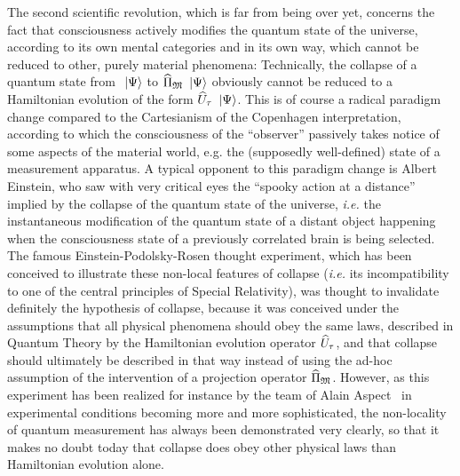 The second scientific revolution, which is far from being over yet, concerns the fact that consciousness actively modifies the quantum state of the universe, according to its own mental categories and in its own way, which cannot be reduced to other, purely material phenomena: Technically, the collapse of a quantum state from $\ \left|{\Psi}\right\rangle$ to $\widehat{\Pi}_{\mathfrak{M}} \ \left|{\Psi}\right\rangle$ obviously cannot be reduced to a Hamiltonian evolution of the form $\widehat{U}_\tau \ \left|{\Psi}\right\rangle$.
This is of course a radical paradigm change compared to the Cartesianism of the Copenhagen interpretation, according to which the consciousness of the ``observer'' passively takes notice of some aspects of the material world, e.g. the (supposedly well-defined) state of a measurement apparatus.
A typical opponent to this paradigm change is Albert Einstein, who saw with very critical eyes the ``spooky action at a distance'' implied by the collapse of the quantum state of the universe, \textit{i.e.} the instantaneous modification of the quantum state of a distant object happening when the consciousness state of a previously correlated brain is being selected.
The famous Einstein-Podolsky-Rosen thought experiment, which has been conceived to illustrate these non-local features of collapse (\textit{i.e.} its incompatibility to one of the central principles of Special Relativity), was thought to invalidate definitely the hypothesis of collapse, because it was conceived under the assumptions that all physical phenomena should obey the same laws, described in Quantum Theory by the Hamiltonian evolution operator $\widehat{U}_\tau$, and that collapse should ultimately be described in that way instead of using the ad-hoc assumption of the intervention of a projection operator $\widehat{\Pi}_{\mathfrak{M}}$.
However, as this experiment has been realized for instance by the team of Alain Aspect~\cite{Aspect1982} in experimental conditions becoming more and more sophisticated, the non-locality of quantum measurement has always been demonstrated very clearly, so that it makes no doubt today that collapse does obey other physical laws than Hamiltonian evolution alone.

